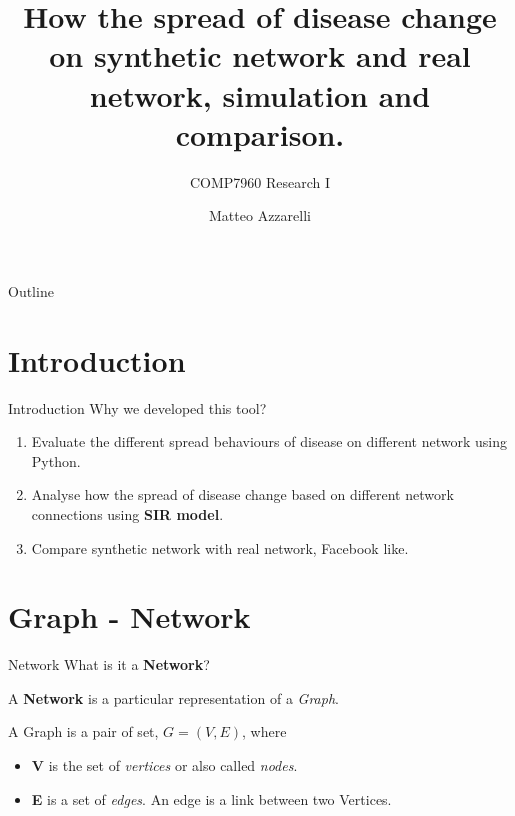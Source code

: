 \documentclass{beamer}
\title{\vspace{1cm}How the spread of disease change on synthetic network and real network, simulation and comparison.}
\subtitle{\vspace{-0cm}COMP7960 Research I}
\author{%
	Matteo Azzarelli}
\date{\vspace{2.5cm}\color{black}{\footnotesize{Academic year 2018/2019}}}
\begin{document}
    
	\maketitle

	\begin{frame}{Outline}
		\tableofcontents
	\end{frame}

	\section{Introduction}
	
	\begin{frame}{Introduction}
		Why we developed this tool?
		\pause
		\begin{enumerate}[<+->]
			\item Evaluate the different spread behaviours of disease on different network using Python.
			\item Analyse how the spread of disease change based on different network connections using \textbf{SIR model}.
			\item Compare synthetic network with real network, Facebook like.
			
		\end{enumerate}
	\end{frame}

	\section{Graph - Network}
	
	\begin{frame}{Network}
		What is it a \textbf{Network}?
		
		\vspace{0.5cm}
		A \textbf{Network} is a particular representation of a \textit{Graph}.
		
		\vspace{0.5cm}
		A Graph is a pair of set, $G = (V, E)$, where 
		\begin{itemize}
		    \item \textbf{V} is the set of \textit{vertices} or also called \textit{
nodes}.
		    \item \textbf{E} is a set of \textit{edges}. An edge is a link between two Vertices.
		\end{itemize}
		\begin{center}
		\end{center}
	\end{frame}
	
\end{document}
